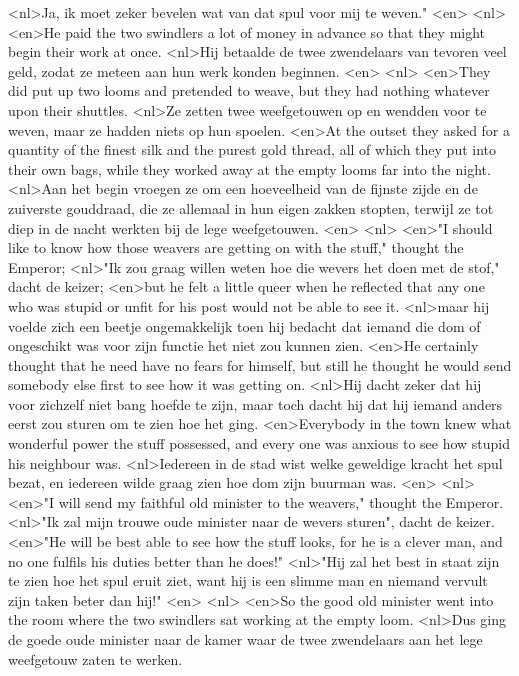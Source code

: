 <nl>Ja, ik moet zeker bevelen wat van dat spul voor mij te weven."
<en>
<nl>
<en>He paid the two swindlers a lot of money in advance so that they might begin their work at once.
<nl>Hij betaalde de twee zwendelaars van tevoren veel geld, zodat ze meteen aan hun werk konden beginnen.
<en>
<nl>
<en>They did put up two looms and pretended to weave, but they had nothing whatever upon their shuttles.
<nl>Ze zetten twee weefgetouwen op en wendden voor te weven, maar ze hadden niets op hun spoelen.
<en>At the outset they asked for a quantity of the finest silk and the purest gold thread, all of which they put into their own bags, while they worked away at the empty looms far into the night.
<nl>Aan het begin vroegen ze om een hoeveelheid van de fijnste zijde en de zuiverste gouddraad, die ze allemaal in hun eigen zakken stopten, terwijl ze tot diep in de nacht werkten bij de lege weefgetouwen.
<en>
<nl>
<en>"I should like to know how those weavers are getting on with the stuff," thought the Emperor;
<nl>"Ik zou graag willen weten hoe die wevers het doen met de stof," dacht de keizer;
<en>but he felt a little queer when he reflected that any one who was stupid or unfit for his post would not be able to see it.
<nl>maar hij voelde zich een beetje ongemakkelijk toen hij bedacht dat iemand die dom of ongeschikt was voor zijn functie het niet zou kunnen zien.
<en>He certainly thought that he need have no fears for himself, but still he thought he would send somebody else first to see how it was getting on.
<nl>Hij dacht zeker dat hij  voor zichzelf niet bang hoefde te zijn, maar toch dacht hij dat hij iemand anders eerst zou sturen om te zien hoe het ging.
<en>Everybody in the town knew what wonderful power the stuff possessed, and every one was anxious to see how stupid his neighbour was.
<nl>Iedereen in de stad wist welke geweldige kracht het spul bezat, en iedereen wilde graag zien hoe dom zijn buurman was.
<en>
<nl>
<en>"I will send my faithful old minister to the weavers," thought the Emperor.
<nl>"Ik zal mijn trouwe oude minister naar de wevers sturen", dacht de keizer.
<en>"He will be best able to see how the stuff looks, for he is a clever man, and no one fulfils his duties better than he does!"
<nl>"Hij zal het best in staat zijn te zien hoe het spul eruit ziet, want hij is een slimme man en niemand vervult zijn taken beter dan hij!"
<en>
<nl>
<en>So the good old minister went into the room where the two swindlers sat working at the empty loom.
<nl>Dus ging de goede oude minister naar de kamer waar de twee zwendelaars aan het lege weefgetouw zaten te werken.
